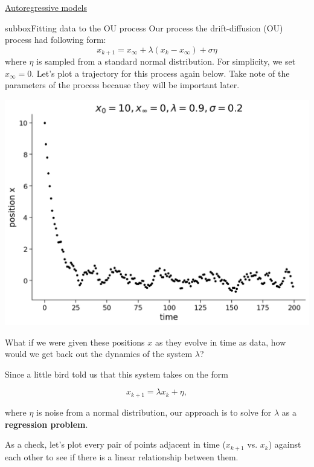 \begin{textbox}{\href{https://compneuro.neuromatch.io/tutorials/W2D2_LinearSystems/student/W2D2_Tutorial4.html}{Autoregressive models } }
\begin{subbox}{subbox}{Fitting data to the OU process}
\scriptsize
 Our process  the drift-diffusion (OU) process had following form:
\[x_{k+1} = x_{\infty} + \lambda(x_k - x_{\infty}) + \sigma \eta\]
where $\eta$ is sampled from a standard normal distribution. 
For simplicity, we set $x_\infty = 0$. Let's plot a trajectory for this process again below. Take note of the parameters of the process because they will be important later.

\begin{center}
\includegraphics[scale=0.25]{Figures/LS/CDS_Figure8.png}
\end{center}
What if we were given these positions $x$ as they evolve in time as data, how would we get back out the dynamics of the system $\lambda$? 

Since a little bird told us that this system takes on the form

$$x_{k+1} = \lambda x_k + \eta,$$

where $\eta$ is noise from a normal distribution, our approach is to solve for $\lambda$ as a \textbf{regression problem}. 

As a check, let's plot every pair of points adjacent in time ($x_{k+1}$ vs. $x_k$) against each other to see if there is a linear relationship between them. 


\end{subbox}
\end{textbox}
